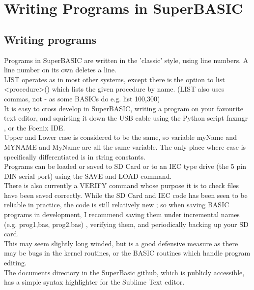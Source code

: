 \chapter{Writing Programs in SuperBASIC}

\section {Writing programs}
Programs in SuperBASIC are written in the 'classic' style, using line numbers. A line number on its own deletes a line.\\

LIST operates as in most other systems, except there is the option to list <procedure>() which lists the given procedure by name. (LIST also uses commas, not - as some BASICs do e.g. list 100,300)\\

It is easy to cross develop in SuperBASIC, writing a program on your favourite text editor, and squirting it down the USB cable using the Python script fnxmgr , or the Foenix IDE.\\

Upper and Lower case is considered to be the same, so variable myName and MYNAME and MyName are all the same variable. The only place where case is specifically differentiated is in string constants.\\

Programs can be loaded or saved to SD Card or to an IEC type drive (the 5 pin DIN serial port) using the SAVE and LOAD command.\\

There is also currently a VERIFY command whose purpose it is to check files have been saved correctly. While the SD Card and IEC code has been seen to be reliable in practice, the code is still relatively new ; so when saving BASIC programs in development, I recommend saving them under incremental names (e.g. prog1,bas, prog2.bas) , verifying them, and periodically backing up your SD card.\\

This may seem slightly long winded, but is a good defensive measure as there may be bugs in the kernel routines, or the BASIC routines which handle program editing. \\

The documents directory in the SuperBasic github, which is publicly accessible, has a simple syntax highlighter for the Sublime Text editor.